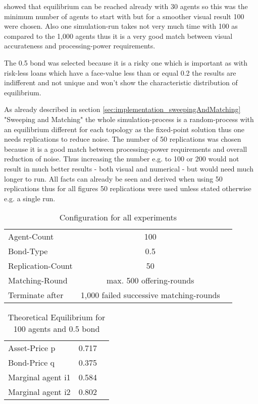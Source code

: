 \documentclass[Bachelorarbeit.tex]{subfiles}
\begin{document}
\bigskip 

\cite{Breuer2015} showed that equilibrium can be reached already with 30 agents so this was the minimum number of agents to start with but for a smoother visual result 100 were chosen. Also one simulation-run takes not very much time with 100 as compared to the 1,000 agents thus it is a very good match between visual accurateness and processing-power requirements.

\medskip

The 0.5 bond was selected because it is a risky one which is important as with risk-less loans which have a face-value less than or equal 0.2 the results are indifferent and not unique and won't show the characteristic distribution of equilibrium.

\medskip

As already described in section \ref{sec:implementation_sweepingAndMatching} "Sweeping and Matching" the whole simulation-process is a random-process with an equilibrium different for each topology as the fixed-point solution thus one needs replications to reduce noise. The number of 50 replications was chosen because it is a good match between processing-power requirements and overall reduction of noise. Thus increasing the number e.g. to 100 or 200 would not result in much better results - both visual and numerical - but would need much longer to run. All facts can already be seen and derived when using 50 replications thus for all figures 50 replications were used unless stated otherwise e.g. a single run.

\begin{table}[H]
	\centering
	\caption{Configuration for all experiments}
	\begin{tabular} { l c r }
		\hline
		Agent-Count & 100 \\
		Bond-Type & 0.5 \\
		Replication-Count & 50 \\
		Matching-Round & max. 500 offering-rounds \\
		Terminate after & 1,000 failed successive matching-rounds \\
		\hline
	\end{tabular}
\end{table}

\begin{table}[H]
	\centering
	\caption{Theoretical Equilibrium for 100 agents and 0.5 bond}
	\begin{tabular} { l c r }
		\hline
		Asset-Price p & 0.717 \\
		Bond-Price q & 0.375 \\
		Marginal agent i1 & 0.584 \\
		Marginal agent i2 & 0.802 \\
		\hline
	\end{tabular}
	\label{tab:theoretical_equilibrium_100Agents_05Bond}
\end{table}
\end{document}
